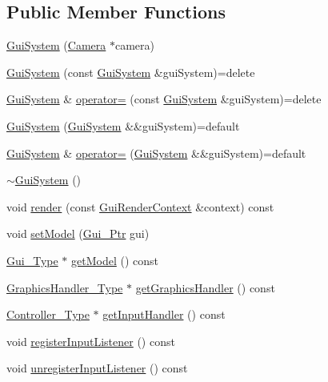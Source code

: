\subsection*{Public Member Functions}
\begin{DoxyCompactItemize}
\item 
\mbox{\hyperlink{classec_1_1_gui_system_aacbeed413d62e5ef4d4b57ccafee200e}{Gui\+System}} (\mbox{\hyperlink{classec_1_1_camera}{Camera}} $\ast$camera)
\item 
\mbox{\hyperlink{classec_1_1_gui_system_a87ff5e071c04700db58206587ac22ef0}{Gui\+System}} (const \mbox{\hyperlink{classec_1_1_gui_system}{Gui\+System}} \&gui\+System)=delete
\item 
\mbox{\hyperlink{classec_1_1_gui_system}{Gui\+System}} \& \mbox{\hyperlink{classec_1_1_gui_system_ad5a367d3f8cb0190ccccfacc61ad1c05}{operator=}} (const \mbox{\hyperlink{classec_1_1_gui_system}{Gui\+System}} \&gui\+System)=delete
\item 
\mbox{\hyperlink{classec_1_1_gui_system_a49db1331145566108321976e4ac95a62}{Gui\+System}} (\mbox{\hyperlink{classec_1_1_gui_system}{Gui\+System}} \&\&gui\+System)=default
\item 
\mbox{\hyperlink{classec_1_1_gui_system}{Gui\+System}} \& \mbox{\hyperlink{classec_1_1_gui_system_ac00212035d5b6fbb16f6f4425f0e8926}{operator=}} (\mbox{\hyperlink{classec_1_1_gui_system}{Gui\+System}} \&\&gui\+System)=default
\item 
\mbox{\hyperlink{classec_1_1_gui_system_a72535435539b29e6d00b96f1f490a725}{$\sim$\+Gui\+System}} ()
\item 
void \mbox{\hyperlink{classec_1_1_gui_system_ac7a924d1ceb23683fab5889c5a9cb944}{render}} (const \mbox{\hyperlink{structec_1_1_gui_render_context}{Gui\+Render\+Context}} \&context) const
\item 
void \mbox{\hyperlink{classec_1_1_gui_system_a374997d1a8bbae3c72425bef4af574a0}{set\+Model}} (\mbox{\hyperlink{classec_1_1_gui_system_a2ab0b1663243d1dbbf6624fd4c4d705e}{Gui\+\_\+\+Ptr}} gui)
\item 
\mbox{\hyperlink{classec_1_1_gui_system_a7f6534f297da47e8618dd1b9fed934ae}{Gui\+\_\+\+Type}} $\ast$ \mbox{\hyperlink{classec_1_1_gui_system_ac3fa8830a25f04be9fc3c37860060dc5}{get\+Model}} () const
\item 
\mbox{\hyperlink{classec_1_1_gui_system_ace2e875c44326f620358ce6b1dfc3bc7}{Graphics\+Handler\+\_\+\+Type}} $\ast$ \mbox{\hyperlink{classec_1_1_gui_system_affce2c93ce9689137662705d50405922}{get\+Graphics\+Handler}} () const
\item 
\mbox{\hyperlink{classec_1_1_gui_system_a06ff8d5daa43acea2e7ff43964bb14dd}{Controller\+\_\+\+Type}} $\ast$ \mbox{\hyperlink{classec_1_1_gui_system_a0b8a9b486284a25044a8783d3c9f8744}{get\+Input\+Handler}} () const
\item 
void \mbox{\hyperlink{classec_1_1_gui_system_ab44adcdde652c58408b405b1c130615e}{register\+Input\+Listener}} () const
\item 
void \mbox{\hyperlink{classec_1_1_gui_system_a18d7d063334763b264da1392199f4c4e}{unregister\+Input\+Listener}} () const
\end{DoxyCompactItemize}


